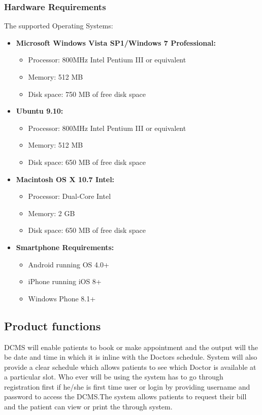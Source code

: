 \documentclass[11 pt]{article}
\begin{document}
    \subsubsection{Hardware Requirements}
The supported Operating Systems:
\begin{itemize}

\item
        \textbf{Microsoft Windows Vista SP1/Windows 7 Professional:}
        \begin{itemize}
        
            \item
            Processor: 800MHz Intel Pentium III or equivalent
            \item
            Memory: 512 MB
            \item
            Disk space: 750 MB of free disk space
            \end{itemize}
\item
        \textbf{Ubuntu 9.10:}
        \begin{itemize}
        \item
            Processor: 800MHz Intel Pentium III or equivalent
            \item
            Memory: 512 MB
            \item
            Disk space: 650 MB of free disk space
            \end{itemize}
        \item
        \textbf{Macintosh OS X 10.7 Intel:}
        \begin{itemize}
        
            \item
            Processor: Dual-Core Intel
            \item
            Memory: 2 GB
            \item
            Disk space: 650 MB of free disk space
            \end{itemize}
            \item
            \textbf{Smartphone Requirements:}
\begin{itemize}

\item
    Android running OS 4.0+
    \item
    iPhone running iOS 8+
    \item
    Windows Phone 8.1+
\end{itemize}
\end{itemize}
    \subsection{Product functions}
DCMS will enable patients to book or make appointment and the output will the be date and time in which it is inline with the Doctors schedule. System will
    also provide a clear schedule which allows patients to see
    which Doctor is available at a particular slot. Who ever
    will be using the system has to go through registration
    first if he/she is first time user or login by providing
    username and password to access the DCMS.The system allows patients to request their bill and the patient can view or print the through system.
\end{document}
